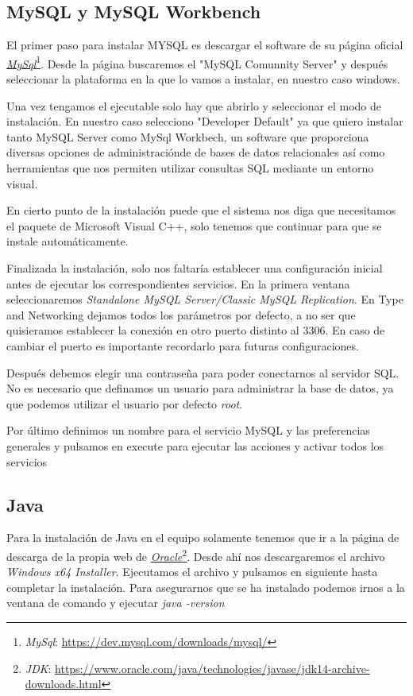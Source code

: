 \subsection{MySQL y MySQL Workbench}

El primer paso para instalar MYSQL es descargar el software de su página oficial \href{https://dev.mysql.com/downloads/mysql/}{\textit{MySql}}\footnote{\textit{MySql}: \url{https://dev.mysql.com/downloads/mysql/}}. Desde la página buscaremos el "MySQL Comunnity Server" y después seleccionar la plataforma en la que lo vamos a instalar, en nuestro caso windows.

Una vez tengamos el ejecutable solo hay que abrirlo y seleccionar el modo de instalación. En nuestro caso selecciono "Developer Default" ya que quiero instalar tanto MySQL Server como MySql Workbech, un software que proporciona diversas opciones de administraciónde de bases de datos relacionales así como herramientas que nos permiten utilizar consultas SQL mediante un entorno visual.

En cierto punto de la instalación puede que el sistema nos diga que necesitamos el paquete de Microsoft Visual C++, solo tenemos que continuar para que se instale automáticamente.

Finalizada la instalación, solo nos faltaría establecer una configuración inicial antes de ejecutar los correspondientes servicios. En la primera ventana seleccionaremos \textit{Standalone MySQL Server/Classic MySQL Replication}. En Type and Networking dejamos todos los parámetros por defecto, a no ser que quisieramos establecer la conexión en otro puerto distinto al 3306. En caso de cambiar el puerto es importante recordarlo para futuras configuraciones.

Después debemos elegir una contraseña para poder conectarnos al servidor SQL. No es necesario que definamos un usuario para administrar la base de datos, ya que podemos utilizar el usuario por defecto \textit{root}.

Por último definimos un nombre para el servicio MySQL y las preferencias generales y pulsamos en execute para ejecutar las acciones y activar todos los servicios

\subsection{Java}

Para la instalación de Java en el equipo solamente tenemos que ir a la página de descarga de la propia web de \href{https://www.oracle.com/java/technologies/javase/jdk14-archive-downloads.html}{\textit{Oracle}}\footnote{\textit{JDK}: \url{https://www.oracle.com/java/technologies/javase/jdk14-archive-downloads.html}}. Desde ahí nos descargaremos el archivo \textit{Windows x64 Installer}. Ejecutamos el archivo y pulsamos en siguiente hasta completar la instalación. Para asegurarnos que se ha instalado podemos irnos a la ventana de comando y ejecutar \textit{java -version}

